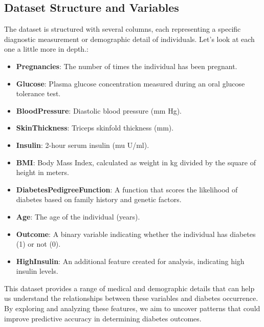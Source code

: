 \documentclass[
]{article}
\providecommand{\tightlist}{%
  \setlength{\itemsep}{0pt}\setlength{\parskip}{0pt}}
\begin{document}
\newpage

\subsection{Dataset Structure and
Variables}\label{dataset-structure-and-variables}

The dataset is structured with several columns, each representing a
specific diagnostic measurement or demographic detail of individuals.
Let's look at each one a little more in depth.:

\begin{itemize}
\tightlist
\item
  \textbf{Pregnancies}: The number of times the individual has been
  pregnant.\\
\item
  \textbf{Glucose}: Plasma glucose concentration measured during an oral
  glucose tolerance test.\\
\item
  \textbf{BloodPressure}: Diastolic blood pressure (mm Hg).\\
\item
  \textbf{SkinThickness}: Triceps skinfold thickness (mm).\\
\item
  \textbf{Insulin}: 2-hour serum insulin (mu U/ml).\\
\item
  \textbf{BMI}: Body Mass Index, calculated as weight in kg divided by
  the square of height in meters.\\
\item
  \textbf{DiabetesPedigreeFunction}: A function that scores the
  likelihood of diabetes based on family history and genetic factors.\\
\item
  \textbf{Age}: The age of the individual (years).\\
\item
  \textbf{Outcome}: A binary variable indicating whether the individual
  has diabetes (1) or not (0).\\
\item
  \textbf{HighInsulin}: An additional feature created for analysis,
  indicating high insulin levels.
\end{itemize}

This dataset provides a range of medical and demographic details that
can help us understand the relationships between these variables and
diabetes occurrence. By exploring and analyzing these features, we aim
to uncover patterns that could improve predictive accuracy in
determining diabetes outcomes.
\end{document}
